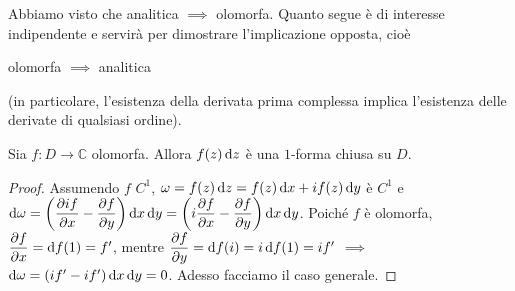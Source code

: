 Abbiamo visto che analitica $\implies$ olomorfa. Quanto segue è di interesse indipendente e servirà per dimostrare l'implicazione opposta, cioè
\begin{center}
  olomorfa $\implies$ analitica
\end{center}
(in particolare, l'esistenza della derivata prima complessa implica l'esistenza delle derivate di qualsiasi ordine).

\begin{thm}
  Sia $f:D \longrightarrow \mathbb{C}$ olomorfa. Allora $f(z)\mathop{}\!\mathrm{d} z$ è una $1$-forma chiusa su $D$.
\end{thm}

\begin{proof}
  Assumendo $f$ $C^1$, $\omega=f(z)\mathop{}\!\mathrm{d} z=f(z)\mathop{}\!\mathrm{d} x+if(z)\mathop{}\!\mathrm{d} y$ è $C^1$ e $\mathop{}\!\mathrm{d}\omega=\left(\dfrac{\partial if}{\partial x}-\dfrac{\partial f}{\partial y}\right)\mathop{}\!\mathrm{d} x\mathop{}\!\mathrm{d} y=\left(i\dfrac{\partial f}{\partial x}-\dfrac{\partial f}{\partial y}\right)\mathop{}\!\mathrm{d} x\mathop{}\!\mathrm{d} y$.
  Poiché $f$ è olomorfa, $\dfrac{\partial f}{\partial x}=\mathop{}\!\mathrm{d} f(1)=f'$, mentre $\dfrac{\partial f}{\partial y}=\mathop{}\!\mathrm{d} f(i)=i\mathop{}\!\mathrm{d} f(1)=if'$ $\implies$ $\mathop{}\!\mathrm{d}\omega=(if'-if')\mathop{}\!\mathrm{d} x\mathop{}\!\mathrm{d} y=0$. Adesso facciamo il caso generale.


\end{proof}
